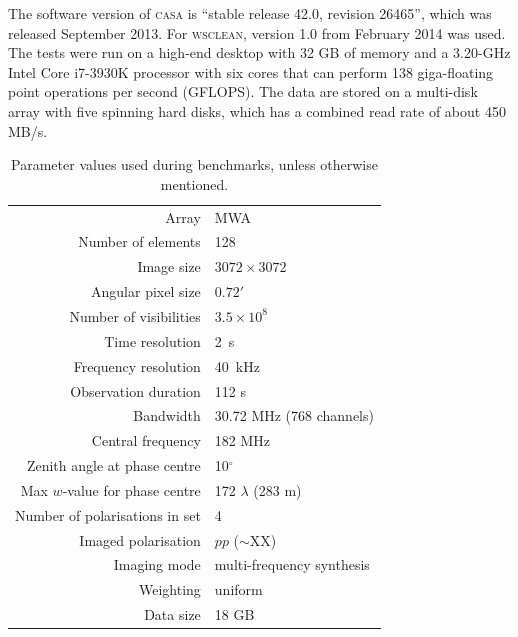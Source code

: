 \documentclass[useAMS,usenatbib]{mn2e}
\newcommand{\degree}{\ensuremath{^{\circ}}\xspace}
\begin{document}
The software version of \textsc{casa} is ``stable release 42.0, revision 26465'', which was released September 2013. For \textsc{wsclean}, version 1.0 from February 2014 was used. The tests were run on a high-end desktop with 32 GB of memory and a 3.20-GHz Intel Core i7-3930K processor with six cores that can perform 138 giga-floating point operations per second (GFLOPS). The data are stored on a multi-disk array with five spinning hard disks, which has a combined read rate of about 450 MB/s.
\begin{table}%
\caption{Parameter values used during benchmarks, unless otherwise mentioned.} \label{tbl:default-parameters}%
\begin{center}\begin{tabular}{rl}%
\hline
Array & MWA \\
Number of elements & 128 \\
Image size & $3072 \times 3072$ \\
Angular pixel size & $0.72'$ \\
Number of visibilities & $3.5 \times 10^8$ \\
Time resolution & 2~s \\
Frequency resolution & 40~kHz \\
Observation duration & 112 s\\
Bandwidth & 30.72 MHz (768 channels)\\
Central frequency & 182 MHz \\
Zenith angle at phase centre & 10\degree \\
Max $w$-value for phase centre & 172 $\lambda$ (283 m) \\
Number of polarisations in set & 4 \\
Imaged polarisation & $pp$ ($\sim$XX) \\
Imaging mode & multi-frequency synthesis \\
Weighting & uniform \\
Data size & 18 GB \\
\hline
\end{tabular}\end{center}\end{table}
\end{document}
